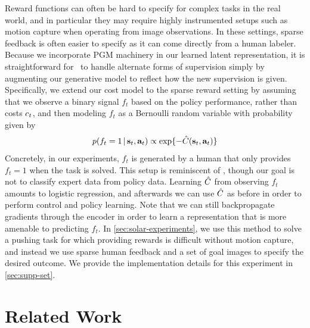 Reward functions can often be hard to specify for complex tasks in the real world, and in particular they may require highly instrumented setups such as motion capture when operating from image observations. In these settings, sparse feedback is often easier to specify as it can come directly from a human labeler. Because we incorporate PGM machinery in our learned latent representation, it is straightforward for \metabbr\ to handle alternate forms of supervision simply by augmenting our generative model to reflect how the new supervision is given. Specifically, we extend our cost model to the sparse reward setting by assuming that we observe a binary signal $f_t$ based on the policy performance, rather than costs $c_t$, and then modeling $f_t$ as a Bernoulli random variable with probability given by
\[
    p(f_t=1\given\state_t,\action_t)\propto\exp{-\costmodel(\state_t,\action_t)}
\]
Concretely, in our experiments, $f_t$ is generated by a human that only provides $f_t=1$ when the task is solved. This setup is reminiscent of \citet{vice}, though our goal is not to classify expert data from policy data. Learning $\hat{C}$ from observing $f_t$ amounts to logistic regression, and afterwards we can use $\hat{C}$ as before in order to perform control and policy learning. Note that we can still backpropagate gradients through the encoder in order to learn a representation that is more amenable to predicting $f_t$. In \autoref{sec:solar-experiments}, we use this method to solve a pushing task for which providing rewards is difficult without motion capture, and instead we use sparse human feedback and a set of goal images to specify the desired outcome. We provide the implementation details for this experiment in \autoref{sec:supp-set}.


\section{Related Work}
\label{sec:related}

